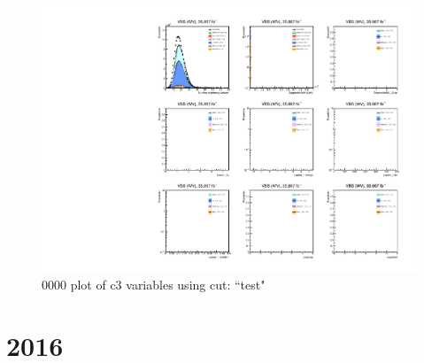 \documentclass{article}
\begin{document}
                        \begin{figure}[H]
                            \centering
                            \caption{0000 plot of c3 variables using cut: ``test"}
                            \includegraphics[width=\textwidth]{0000/c3_0000_test.pdf}
                        \end{figure} 
    \section*{2016}
\end{document}
